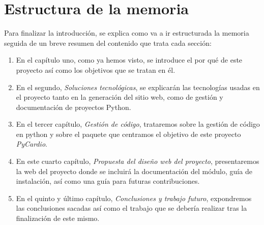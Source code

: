\section{Estructura de la memoria}
\label{sec:estruc}
Para finalizar la introducción, se explica como va a ir estructurada la memoria seguida de un breve resumen del contenido que trata cada sección:
\begin{enumerate}
    \item En el capítulo uno, como ya hemos visto, se introduce el por qué de este proyecto así como los objetivos que se tratan en él.
    \item En el segundo, \emph{Soluciones tecnológicas}, se explicarán las tecnologías usadas en el proyecto tanto en la generación del sitio web, como de gestión y documentación de proyectos Python.
    \item En el tercer capítulo, \emph{Gestión de código}, trataremos sobre la gestión de código en python y sobre el paquete que centramos el objetivo de este proyecto \emph{PyCardio}.
    \item En este cuarto capítulo, \emph{Propuesta del diseño web del proyecto}, presentaremos la web del proyecto donde se incluirá la documentación del módulo, guía de instalación, así como una guía para futuras contribuciones.
    \item En el quinto y último capítulo, \emph{Conclusiones y trabajo futuro}, expondremos las conclusiones sacadas así como el trabajo que se debería realizar tras la finalización de este mismo.
\end{enumerate}
